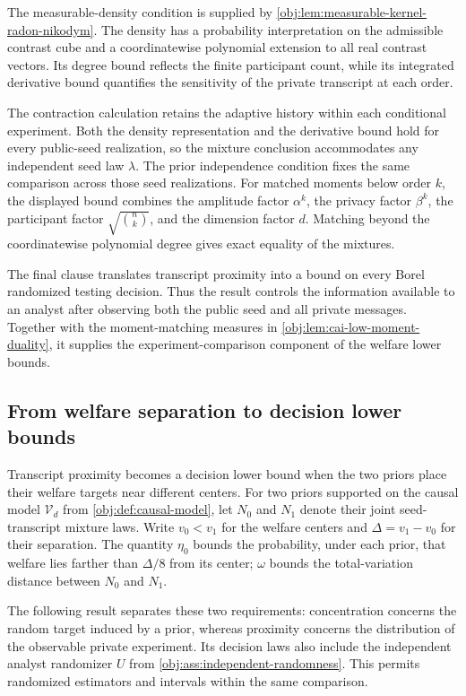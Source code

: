 \documentclass[11pt]{article}
\begin{document}
The measurable-density condition is supplied by \cref{obj:lem:measurable-kernel-radon-nikodym}. The density has a probability interpretation on the admissible contrast cube and a coordinatewise polynomial extension to all real contrast vectors. Its degree bound reflects the finite participant count, while its integrated derivative bound quantifies the sensitivity of the private transcript at each order.

The contraction calculation retains the adaptive history within each conditional experiment. Both the density representation and the derivative bound hold for every public-seed realization, so the mixture conclusion accommodates any independent seed law \(\lambda\). The prior independence condition fixes the same comparison across those seed realizations. For matched moments below order \(k\), the displayed bound combines the amplitude factor \(\alpha^k\), the privacy factor \(\beta^k\), the participant factor \(\sqrt{\binom nk}\), and the dimension factor \(d\). Matching beyond the coordinatewise polynomial degree gives exact equality of the mixtures.

The final clause translates transcript proximity into a bound on every Borel randomized testing decision. Thus the result controls the information available to an analyst after observing both the public seed and all private messages. Together with the moment-matching measures in \cref{obj:lem:cai-low-moment-duality}, it supplies the experiment-comparison component of the welfare lower bounds.

\subsection{From welfare separation to decision lower bounds}

Transcript proximity becomes a decision lower bound when the two priors place their welfare targets near different centers. For two priors supported on the causal model \(\mathcal V_d\) from \cref{obj:def:causal-model}, let \(N_0\) and \(N_1\) denote their joint seed-transcript mixture laws. Write \(v_0<v_1\) for the welfare centers and \(\Delta=v_1-v_0\) for their separation. The quantity \(\eta_0\) bounds the probability, under each prior, that welfare lies farther than \(\Delta/8\) from its center; \(\omega\) bounds the total-variation distance between \(N_0\) and \(N_1\).

The following result separates these two requirements: concentration concerns the random target induced by a prior, whereas proximity concerns the distribution of the observable private experiment. Its decision laws also include the independent analyst randomizer \(U\) from \cref{obj:ass:independent-randomness}. This permits randomized estimators and intervals within the same comparison.
\end{document}

